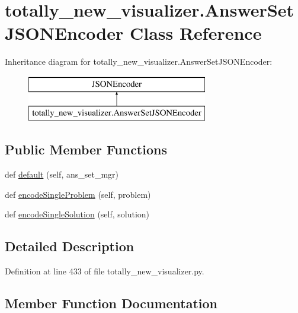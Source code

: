 \hypertarget{classtotally__new__visualizer_1_1_answer_set_j_s_o_n_encoder}{}\section{totally\+\_\+new\+\_\+visualizer.\+Answer\+Set\+J\+S\+O\+N\+Encoder Class Reference}
\label{classtotally__new__visualizer_1_1_answer_set_j_s_o_n_encoder}
Inheritance diagram for totally\+\_\+new\+\_\+visualizer.\+Answer\+Set\+J\+S\+O\+N\+Encoder\+:\begin{figure}[H]
\begin{center}
\leavevmode
\includegraphics[height=2.000000cm]{classtotally__new__visualizer_1_1_answer_set_j_s_o_n_encoder}
\end{center}
\end{figure}
\subsection*{Public Member Functions}
\begin{DoxyCompactItemize}
\item 
def \hyperlink{classtotally__new__visualizer_1_1_answer_set_j_s_o_n_encoder_a104cc50e2ac18448721cdf608aef3c90}{default} (self, ans\+\_\+set\+\_\+mgr)
\item 
def \hyperlink{classtotally__new__visualizer_1_1_answer_set_j_s_o_n_encoder_a9426d9aabb2c10aa95cd64fd7535ddfb}{encode\+Single\+Problem} (self, problem)
\item 
def \hyperlink{classtotally__new__visualizer_1_1_answer_set_j_s_o_n_encoder_a2aff8b46377f69068f2b96a61a3225dd}{encode\+Single\+Solution} (self, solution)
\end{DoxyCompactItemize}


\subsection{Detailed Description}


Definition at line 433 of file totally\+\_\+new\+\_\+visualizer.\+py.



\subsection{Member Function Documentation}
\hypertarget{classtotally__new__visualizer_1_1_answer_set_j_s_o_n_encoder_a104cc50e2ac18448721cdf608aef3c90}{}
